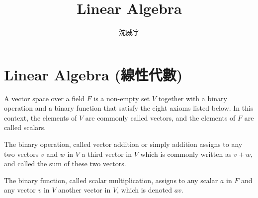 \documentclass[a4paper,12pt]{report}
\begin{document}
\title{Linear Algebra}
\author{沈威宇}
\date{\temtoday}
\titletocdoc
\chapter{Linear Algebra (線性代數)}
A vector space over a field $F$ is a non-empty set $V$ together with a binary operation and a binary function that satisfy the eight axioms listed below. In this context, the elements of $V$ are commonly called vectors, and the elements of $F$ are called scalars.

The binary operation, called vector addition or simply addition assigns to any two vectors $v$ and $w$ in $V$ a third vector in $V$ which is commonly written as $v + w$, and called the sum of these two vectors.

The binary function, called scalar multiplication, assigns to any scalar $a$ in $F$ and any vector $v$ in $V$ another vector in $V$, which is denoted $av$.
\end{document}

